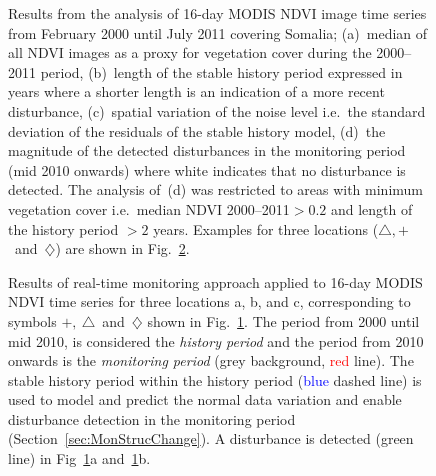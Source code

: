 \documentclass[authoryear,preprint,review,10pt]{elsarticle}
\begin{document}
\begin{figure}[htp]
\centering
 \caption{Results from the analysis of 16-day MODIS NDVI image time series from February 2000 until July 2011 covering Somalia; (a)~median of all NDVI
 images as a proxy for vegetation cover during the 2000--2011 period, (b)~length of the stable history period expressed in years where a shorter length is
 an indication of a more recent disturbance, (c)~spatial variation of the noise level i.e.\ the standard deviation of the residuals of the stable history
 model, (d)~the magnitude of the detected disturbances in the monitoring period (mid 2010 onwards) where white indicates that no disturbance is detected. 
 The analysis of~(d)
 was restricted to areas with minimum vegetation cover i.e.\ median NDVI  2000--2011$> 0.2$ and length of the history period $> 2$ years. Examples for three locations ($\triangle,+$~and~$\diamondsuit$) are shown in Fig.~\ref{fig:realmon}.}
 \label{fig:spatial}
\end{figure}

\begin{figure}[htp]
\centering
  \caption{
 Results of real-time monitoring approach applied to 16-day MODIS NDVI time series for three locations a, b, and c, corresponding to symbols
 $+,~\triangle$~and~$\diamondsuit$ shown in Fig.~\ref{fig:spatial}. The period from 2000 until mid 2010, is considered the \emph{history period} and the
 period from 2010 onwards is the \emph{monitoring period} (grey background, \textcolor{red} {red} line). The stable history period within the
 history period (\textcolor{blue} {blue} dashed line) is used to model and predict the normal data variation and enable disturbance detection in the
 monitoring period (Section~\ref{sec:MonStrucChange}).  A disturbance is detected (\textcolor{OliveGreen} {green} line) in Fig~\ref{fig:spatial}a and~\ref{fig:spatial}b.}
  \label{fig:realmon}
\end{figure}
 
\end{document}
